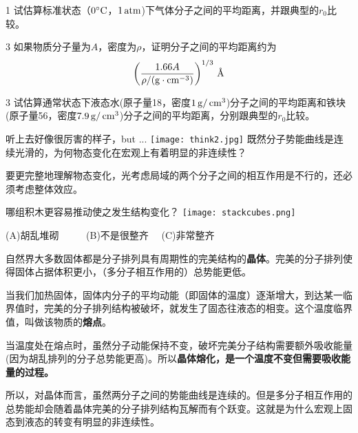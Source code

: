 \documentclass[CJK]{beamer}
\begin{document}
\begin{frame}
\bch
\bitem
\item[1]{试估算标准状态（$0^\circ \mathrm{C}$，$1\,\mathrm{atm}$)下气体分子之间的平均距离，并跟典型的$r_0$比较。}
\item[3]{如果物质分子量为$A$，密度为$\rho$，证明分子之间的平均距离约为
$$\left(\frac{1.66 A }{\rho / (\mathrm{g}\cdot \mathrm{cm}^{-3})}\right)^{1/3}\,\text{\AA}$$
}
\item[3]{试估算通常状态下液态水(原子量18，密度$1\,\mathrm{g}/\,\mathrm{cm}^3$)分子之间的平均距离和铁块(原子量56，密度$7.9\,\mathrm{g}/\,\mathrm{cm}^3$)分子之间的平均距离，分别跟典型的$r_0$比较。}
\eitem
\ech
\end{frame}


\begin{frame}
\bch
听上去好像很厉害的样子，but ...
\bcenter
\texttt{[image: think2.jpg]}
\ecenter
既然分子势能曲线是连续光滑的，为何物态变化在宏观上有着明显的非连续性？
\ech
\end{frame}

\begin{frame}
\bch
要更完整地理解物态变化，光考虑局域的两个分子之间的相互作用是不行的，还必须考虑整体效应。
\ech
\end{frame}

\begin{frame}
\bch
哪组积木更容易推动使之发生结构变化？
\texttt{[image: stackcubes.png]}

(A)胡乱堆砌 \ \ \ \ \  (B)不是很整齐 \ \ (C)非常整齐

\ech
\end{frame}

\begin{frame}
\bch
\bitem
\item{自然界大多数固体都是分子排列具有周期性的完美结构的{\bf 晶体}。完美的分子排列使得固体占据体积更小，（多分子相互作用的）总势能更低。}
\item{当我们加热固体，固体内分子的平均动能（即固体的温度）逐渐增大，到达某一临界值时，完美的分子排列结构被破坏，就发生了固态往液态的相变。这个温度临界值，叫做该物质的{\bf 熔点}。}
\item{当温度处在熔点时，虽然分子动能保持不变，破坏完美分子结构需要额外吸收能量(因为胡乱排列的分子总势能更高)。所以{\bf 晶体熔化，是一个温度不变但需要吸收能量的过程。}}
\eitem
\ech
\end{frame}

\begin{frame}
\bch
所以，对晶体而言，虽然两分子之间的势能曲线是连续的。但是多分子相互作用的总势能却会随着晶体完美的分子排列结构瓦解而有个跃变。这就是为什么宏观上固态到液态的转变有明显的非连续性。
\ech
\end{frame}
\end{document}
